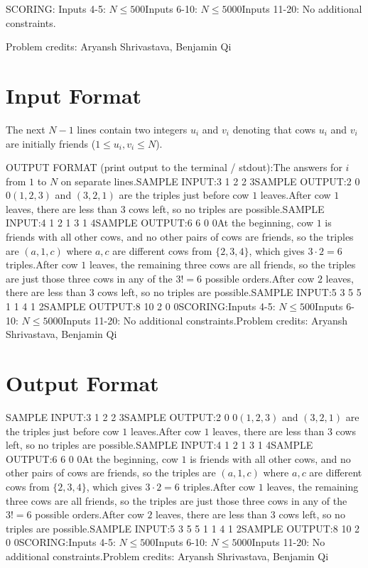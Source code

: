 \documentclass[12pt]{article}
\begin{document}
SCORING:
Inputs 4-5: $N\le 500$Inputs 6-10: $N\le 5000$Inputs 11-20: No additional constraints.


Problem credits: Aryansh Shrivastava, Benjamin Qi



\section*{Input Format}
The next $N-1$ lines contain two integers $u_i$ and $v_i$ denoting that cows
$u_i$ and $v_i$ are initially friends ($1\le u_i,v_i\le N$).

OUTPUT FORMAT (print output to the terminal / stdout):The answers for $i$ from $1$ to $N$ on separate lines.SAMPLE INPUT:3
1 2
2 3SAMPLE OUTPUT:2
0
0$(1,2,3)$ and $(3,2,1)$ are the triples just before cow $1$ leaves.After cow
$1$ leaves, there are less than $3$ cows left, so no triples are possible.SAMPLE INPUT:4
1 2
1 3
1 4SAMPLE OUTPUT:6
6
0
0At the beginning, cow $1$ is friends with all other cows, and no other pairs of
cows are friends, so the triples are $(a, 1, c)$ where $a, c$ are different cows
from $\{2, 3, 4\}$, which gives $3 \cdot 2 = 6$ triples.After cow $1$ leaves, the remaining three cows are all friends, so the triples
are just those three cows in any of the $3! = 6$ possible orders.After cow $2$ leaves, there are less than $3$ cows left, so no triples are
possible.SAMPLE INPUT:5
3 5
5 1
1 4
1 2SAMPLE OUTPUT:8
10
2
0
0SCORING:Inputs 4-5: $N\le 500$Inputs 6-10: $N\le 5000$Inputs 11-20: No additional constraints.Problem credits: Aryansh Shrivastava, Benjamin Qi

\section*{Output Format}
SAMPLE INPUT:3
1 2
2 3SAMPLE OUTPUT:2
0
0$(1,2,3)$ and $(3,2,1)$ are the triples just before cow $1$ leaves.After cow
$1$ leaves, there are less than $3$ cows left, so no triples are possible.SAMPLE INPUT:4
1 2
1 3
1 4SAMPLE OUTPUT:6
6
0
0At the beginning, cow $1$ is friends with all other cows, and no other pairs of
cows are friends, so the triples are $(a, 1, c)$ where $a, c$ are different cows
from $\{2, 3, 4\}$, which gives $3 \cdot 2 = 6$ triples.After cow $1$ leaves, the remaining three cows are all friends, so the triples
are just those three cows in any of the $3! = 6$ possible orders.After cow $2$ leaves, there are less than $3$ cows left, so no triples are
possible.SAMPLE INPUT:5
3 5
5 1
1 4
1 2SAMPLE OUTPUT:8
10
2
0
0SCORING:Inputs 4-5: $N\le 500$Inputs 6-10: $N\le 5000$Inputs 11-20: No additional constraints.Problem credits: Aryansh Shrivastava, Benjamin Qi
\end{document}
